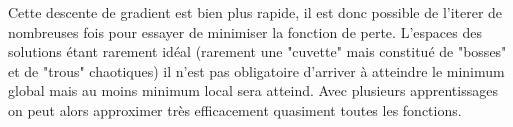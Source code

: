 Cette descente de gradient est bien plus rapide, il est donc possible de l'iterer de nombreuses fois
pour essayer de minimiser la fonction de perte.
L'espaces des solutions étant rarement idéal
(rarement une "cuvette" mais constitué de "bosses" et de "trous" chaotiques)
il n'est pas obligatoire d'arriver à atteindre le minimum global mais au moins minimum local sera atteind.
Avec plusieurs apprentissages on peut alors approximer très efficacement quasiment toutes les fonctions.

